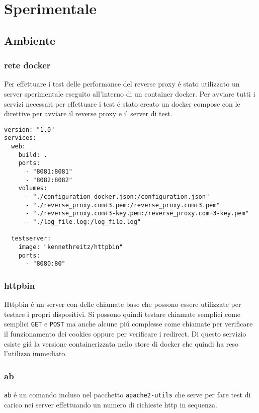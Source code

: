 \chapter{Sperimentale}
\label{cha:Sperimentale}

\section{Ambiente}
\subsection{rete docker}
Per effettuare i test delle performance del reverse proxy é stato utilizzato un server sperimentale eseguito all'interno di un container docker. Per avviare tutti i servizi necessari per effettuare i test é stato creato un docker compose con le direttive per avviare il reverse proxy e il server di test.

\begin{lstlisting}[language=DockerCompose]
version: "1.0"
services:
  web:
    build: .
    ports:
      - "8081:8081"
      - "8082:8082"
    volumes:
      - "./configuration_docker.json:/configuration.json"
      - "./reverse_proxy.com+3.pem:/reverse_proxy.com+3.pem"
      - "./reverse_proxy.com+3-key.pem:/reverse_proxy.com+3-key.pem"
      - "./log_file.log:/log_file.log"

  testserver:
    image: "kennethreitz/httpbin"
    ports:
      - "8080:80"
\end{lstlisting}

\subsection{httpbin}
\cite{httpbin}
Httpbin é un server con delle chiamate base che possono essere utilizzate per testare i propri dispositivi. Si possono quindi testare chiamate semplici come semplici \texttt{GET} e \texttt{POST} ma anche alcune piú complesse come chiamate per verificare il funzionamento dei cookies oppure per verificare i redirect. Di questo servizio esiste giá la versione containerizzata nello store di docker che quindi ha reso l'utilizzo immediato.

\subsection{ab}
\cite{ab}
\texttt{ab} é un comando incluso nel pacchetto \texttt{apache2-utils} che serve per fare test di carico nei server effettuando un numero di richieste http in sequenza.

